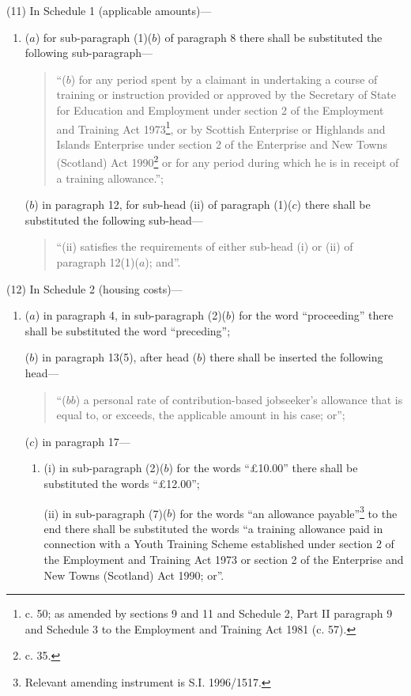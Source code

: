 \documentclass[a4paper]{article}
\begin{document}
(11) In Schedule 1 (applicable amounts)—
\begin{enumerate}\item[]
($a$) for sub-paragraph (1)($b$) of paragraph 8 there shall be substituted the following sub-paragraph—
\begin{quotation}
“($b$) for any period spent by a claimant in undertaking a course of training or instruction provided or approved by the Secretary of State for Education and Employment under section 2 of the Employment and Training Act 1973\footnote{ c. 50; as amended by sections 9 and 11 and Schedule 2, Part II paragraph 9 and Schedule 3 to the Employment and Training Act 1981 (c. 57).}, or by Scottish Enterprise or Highlands and Islands Enterprise under section 2 of the Enterprise and New Towns (Scotland) Act 1990\footnote{ c. 35.} or for any period during which he is in receipt of a training allowance.”;
\end{quotation}

($b$) in paragraph 12, for sub-head (ii) of paragraph (1)($c$) there shall be substituted the following sub-head—
\begin{quotation}
“(ii) satisfies the requirements of either sub-head (i) or (ii) of paragraph 12(1)($a$); and”.
\end{quotation}
\end{enumerate}

(12) In Schedule 2 (housing costs)—
\begin{enumerate}\item[]
($a$) in paragraph 4, in sub-paragraph (2)($b$) for the word “proceeding” there shall be substituted the word “preceding”;

($b$) in paragraph 13(5), after head ($b$) there shall be inserted the following head—
\begin{quotation}
“($bb$) a personal rate of contribution-based jobseeker’s allowance that is equal to, or exceeds, the applicable amount in his case; or”;
\end{quotation}

($c$) in paragraph 17—
\begin{enumerate}\item[]
(i) in sub-paragraph (2)($b$) for the words “£10.00” there shall be substituted the words “£12.00”;

(ii) in sub-paragraph (7)($b$) for the words “an allowance payable”\footnote{\frenchspacing Relevant amending instrument is S.I. 1996/1517.} to the end there shall be substituted the words “a training allowance paid in connection with a Youth Training Scheme established under section 2 of the Employment and Training Act 1973 or section 2 of the Enterprise and New Towns (Scotland) Act 1990; or”.
\end{enumerate}
\end{enumerate}
\end{document}

